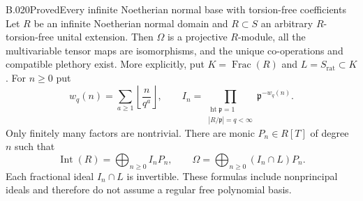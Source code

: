 \begin{saresult}{B.020}{Proved}{Every infinite Noetherian normal base with torsion-free coefficients}
Let $R$ be an infinite Noetherian normal domain and $R\subset S$
an arbitrary $R$-torsion-free unital extension. Then $\Omega$ is a
projective $R$-module, all the multivariable tensor maps are
isomorphisms, and the unique co-operations and compatible plethory
exist. More explicitly, put $K=\operatorname{Frac}(R)$ and
$L=S_{\mathrm{rat}}\subset K$. For $n\ge0$ put
\[
 w_q(n)=\sum_{a\ge1}\left\lfloor\frac{n}{q^a}\right\rfloor,
 \qquad
 I_n=\prod_{\substack{\operatorname{ht}\mathfrak p=1\\
                     |R/\mathfrak p|=q<\infty}}
                 \mathfrak p^{-w_q(n)}.
\]
Only finitely many factors are nontrivial. There are monic
$P_n\in R[T]$ of degree $n$ such that
\[
 \operatorname{Int}(R)=\bigoplus_{n\ge0}I_nP_n,
 \qquad
 \Omega=\bigoplus_{n\ge0}(I_n\cap L)P_n.
\]
Each fractional ideal $I_n\cap L$ is invertible. These formulas
include nonprincipal ideals and therefore do not assume a regular
free polynomial basis.
\end{saresult}
